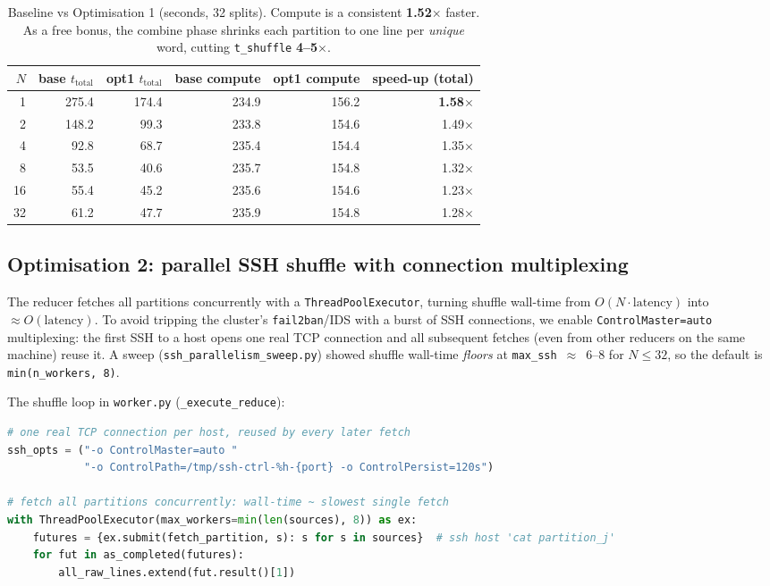 \documentclass[11pt,a4paper]{article}
\newcommand{\code}[1]{\texttt{\small #1}}
\begin{document}
\begin{table}[H]
\centering
\small
\renewcommand{\arraystretch}{1.2}
\begin{tabular}{@{}rrrrrr@{}}
\toprule
$N$ & base $t_{\text{total}}$ & opt1 $t_{\text{total}}$ & base compute & opt1 compute & speed-up (total)\\
\midrule
1  & 275.4 & 174.4 & 234.9 & 156.2 & \textbf{1.58$\times$}\\
2  & 148.2 &  99.3 & 233.8 & 154.6 & 1.49$\times$\\
4  &  92.8 &  68.7 & 235.4 & 154.4 & 1.35$\times$\\
8  &  53.5 &  40.6 & 235.7 & 154.8 & 1.32$\times$\\
16 &  55.4 &  45.2 & 235.6 & 154.6 & 1.23$\times$\\
32 &  61.2 &  47.7 & 235.9 & 154.8 & 1.28$\times$\\
\bottomrule
\end{tabular}
\caption{Baseline vs Optimisation 1 (seconds, 32 splits). Compute is a
consistent \textbf{1.52$\times$} faster. As a free bonus, the combine phase
shrinks each partition to one line per \emph{unique} word, cutting
\code{t\_shuffle} \textbf{4–5$\times$}.}
\end{table}

\subsection{Optimisation 2: parallel SSH shuffle with connection multiplexing}

The reducer fetches all partitions concurrently with a
\code{ThreadPoolExecutor}, turning shuffle wall-time from $O(N\cdot\text{latency})$
into $\approx O(\text{latency})$. To avoid tripping the cluster's
\code{fail2ban}/IDS with a burst of SSH connections, we enable
\code{ControlMaster=auto} multiplexing: the first SSH to a host opens one real
TCP connection and all subsequent fetches (even from other reducers on the same
machine) reuse it. A sweep (\code{ssh\_parallelism\_sweep.py}) showed shuffle
wall-time \emph{floors} at \code{max\_ssh}~$\approx$~6–8 for $N\le32$, so the
default is \code{min(n\_workers, 8)}.

The shuffle loop in \code{worker.py} (\code{\_execute\_reduce}):

\begin{lstlisting}[language=python]
# one real TCP connection per host, reused by every later fetch
ssh_opts = ("-o ControlMaster=auto "
            "-o ControlPath=/tmp/ssh-ctrl-%h-{port} -o ControlPersist=120s")

# fetch all partitions concurrently: wall-time ~ slowest single fetch
with ThreadPoolExecutor(max_workers=min(len(sources), 8)) as ex:
    futures = {ex.submit(fetch_partition, s): s for s in sources}  # ssh host 'cat partition_j'
    for fut in as_completed(futures):
        all_raw_lines.extend(fut.result()[1])
\end{lstlisting}
\end{document}

